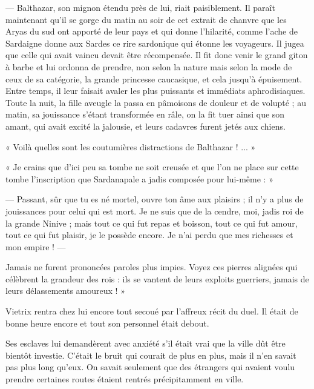 \documentclass[a4paper, 11pt, oneside, polutonikogreek, french]{article}
\begin{document}
--- Balthazar, son mignon étendu près de lui, riait paisiblement. Il paraît maintenant qu'il se gorge du matin au soir de cet extrait de chanvre que les Aryas du sud ont apporté de leur pays et qui donne l'hilarité, comme l'ache de Sardaigne donne aux Sardes ce rire sardonique qui étonne les voyageurs. Il jugea que celle qui avait vaincu devait être récompensée. Il fit donc venir le grand giton à barbe et lui ordonna de prendre, non selon la nature mais selon la mode de ceux de sa catégorie, la grande princesse caucasique, et cela jusqu'à épuisement. Entre temps, il leur faisait avaler les plus puissants et immédiats aphrodisiaques. Toute la nuit, la fille aveugle la passa en pâmoisons de douleur et de volupté ; au matin, sa jouissance s'étant transformée en râle, on la fit tuer ainsi que son amant, qui avait excité la jalousie, et leurs cadavres furent jetés aux chiens.

« Voilà quelles sont les coutumières distractions de Balthazar ! ... »

\bigskip
\centerline{\EightStarTaper}
\centerline{\EightStarTaper\EightStarTaper}
\bigskip

« Je crains que d'ici peu sa tombe ne soit creusée et que l'on ne place sur cette tombe l'inscription que Sardanapale a jadis composée pour lui-même : »

--- Passant, sûr que tu es né mortel, ouvre ton âme aux plaisirs ; il n'y a plus de jouissances pour celui qui est mort. Je ne suis que de la cendre, moi, jadis roi de la grande Ninive ; mais tout ce qui fut repas et boisson, tout ce qui fut amour, tout ce qui fut plaisir, je le possède encore. Je n'ai perdu que mes richesses et mon empire ! ---

Jamais ne furent prononcées paroles plus impies. Voyez ces pierres alignées qui célèbrent la grandeur des rois : ils se vantent de leurs exploits guerriers, jamais de leurs délassements amoureux ! »

\bigskip
\centerline{\EightStarTaper}
\centerline{\EightStarTaper\EightStarTaper}
\bigskip

Vietrix rentra chez lui encore tout secoué par l'affreux récit du duel. Il était de bonne heure encore et tout son personnel était debout.

Ses esclaves lui demandèrent avec anxiété s'il était vrai que la ville dût être bientôt investie. C'était le bruit qui courait de plus en plus, mais il n'en savait pas plus long qu'eux. On savait seulement que des étrangers qui avaient voulu prendre certaines routes étaient rentrés précipitamment en ville.
\end{document}
